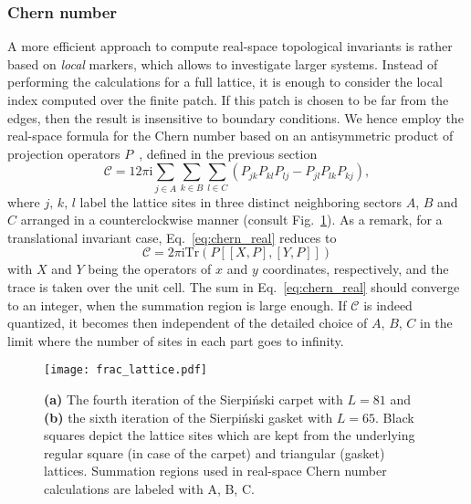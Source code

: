 \subsubsection{Chern number}
A more efficient approach to compute real-space topological invariants is rather based on \emph{local} markers, which allows to investigate larger systems. Instead of performing the calculations for a full lattice, it is enough to consider the local index computed over the finite patch. If this patch is chosen to be far from the edges, then the result is insensitive to boundary conditions. We hence employ the real-space formula for the Chern number based on an antisymmetric product of projection operators $P$~\cite{KITAEV20062}, defined in the previous section
\begin{equation}
\mathcal{C} = 12 \pi \mathrm{i} \sum_{j \in A} \sum_{k \in B} \sum_{l \in C} \left( P_{jk} P_{kl} P_{lj} - P_{jl} P_{lk} P_{kj} \right),
\label{eq:chern_real}
\end{equation}
where $j, \, k, \, l$ label the lattice sites in three distinct neighboring sectors $A$, $B$ and $C$ arranged in a counterclockwise manner (consult Fig.~\ref{fig:lattice}). As a remark, for a translational invariant case, Eq.~\eqref{eq:chern_real} reduces to
\begin{equation}
\mathcal{C} = 2 \pi \mathrm{i} \mathrm{Tr} \left( P \left[ [X, P], [Y, P] \right] \right)
\label{eq:chern_real_translational}
\end{equation}
with $X$ and $Y$ being the operators of $x$ and $y$ coordinates, respectively, and the trace is taken over the unit cell. The sum in Eq.~\eqref{eq:chern_real} should converge to an integer, when the summation region is large enough. If $\mathcal{C}$ is indeed quantized, it becomes then independent of the detailed choice of $A$, $B$, $C$ in the limit where the number of sites in each part goes to infinity.

\begin{figure}[H]
\centering
\texttt{[image: frac\_lattice.pdf]}
\caption[Lattice regularization of Sierpiński carpet and gasket]{\textbf{(a)} The fourth iteration of the Sierpiński carpet with $L = 81$ and \textbf{(b)} the sixth iteration of the Sierpiński gasket with $L = 65$. Black squares depict the lattice sites which are kept from the underlying regular square (in case of the carpet) and triangular (gasket) lattices. Summation regions used in real-space Chern number calculations are labeled with A, B, C.}
\label{fig:lattice}
\end{figure}

